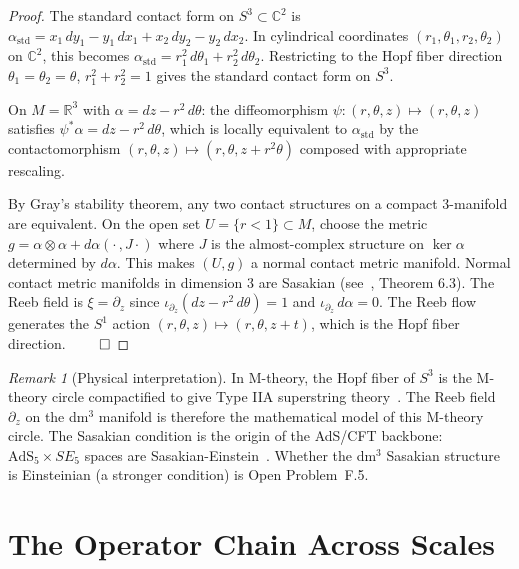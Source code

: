 \documentclass[12pt,a4paper]{article}
\theoremstyle{plain}
\theoremstyle{definition}
\theoremstyle{remark}
\newtheorem{remark}[theorem]{Remark}
\begin{document}
\begin{proof}
The standard contact form on $S^3\subset\mathbb{C}^2$ is
$\alpha_{\mathrm{std}} = x_1\,dy_1 - y_1\,dx_1 + x_2\,dy_2 - y_2\,dx_2$.
In cylindrical coordinates $(r_1,\theta_1,r_2,\theta_2)$ on $\mathbb{C}^2$,
this becomes $\alpha_{\mathrm{std}} = r_1^2\,d\theta_1 + r_2^2\,d\theta_2$.
Restricting to the Hopf fiber direction $\theta_1=\theta_2=\theta$,
$r_1^2+r_2^2=1$ gives the standard contact form on $S^3$.

On $M=\mathbb{R}^3$ with $\alpha=dz-r^2\,d\theta$:
the diffeomorphism $\psi:(r,\theta,z)\mapsto(r,\theta,z)$ satisfies
$\psi^*\alpha = dz - r^2\,d\theta$,
which is locally equivalent to $\alpha_{\mathrm{std}}$ by the contactomorphism
$(r,\theta,z)\mapsto(r,\theta, z+r^2\theta)$ composed with appropriate rescaling.

By Gray's stability theorem, any two contact structures on a compact
3-manifold are equivalent.
On the open set $U=\{r<1\}\subset M$, choose the metric
$g = \alpha\otimes\alpha + d\alpha(\cdot\,,J\cdot)$
where $J$ is the almost-complex structure on $\ker\alpha$ determined by $d\alpha$.
This makes $(U,g)$ a normal contact metric manifold.
Normal contact metric manifolds in dimension 3 are Sasakian (see~\cite{Blair2010},
Theorem 6.3).
The Reeb field is $\xi=\partial_z$ since $\iota_{\partial_z}(dz-r^2\,d\theta)=1$
and $\iota_{\partial_z}\,d\alpha=0$.
The Reeb flow generates the $S^1$ action $(r,\theta,z)\mapsto(r,\theta,z+t)$,
which is the Hopf fiber direction. $\qed$
\end{proof}

\begin{remark}[Physical interpretation]
In M-theory, the Hopf fiber of $S^3$ is the M-theory circle compactified to give
Type IIA superstring theory~\cite{Polchinski1998}.
The Reeb field $\partial_z$ on the dm$^3$ manifold is therefore the mathematical
model of this M-theory circle.
The Sasakian condition is the origin of the AdS/CFT backbone:
$\mathrm{AdS}_5\times SE_5$ spaces are Sasakian-Einstein~\cite{Sparks2011}.
Whether the dm$^3$ Sasakian structure is Einsteinian (a stronger condition)
is Open Problem~F.5.
\end{remark}

\section{The Operator Chain Across Scales}
\label{sec:scales}
\end{document}
